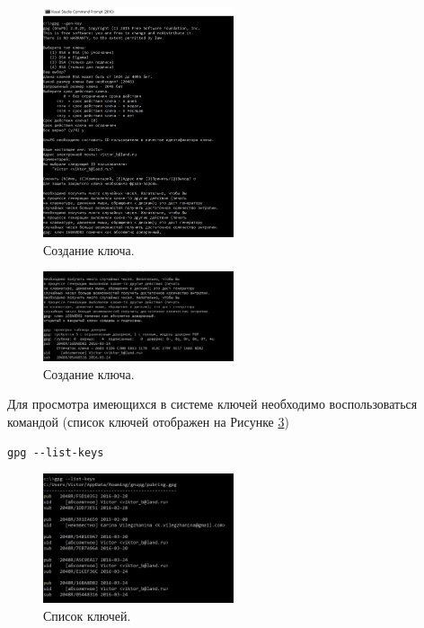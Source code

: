 \documentclass[10pt,a4paper]{article}
\begin{document}
\begin{figure}[h]
\begin{center}
\includegraphics[width=0.5\textwidth]{console_create_1} %
\caption{Создание ключа.}
\label{fig:console_create_1}
\end{center}
\end{figure}

\begin{figure}[h]
\begin{center}
\includegraphics[width=0.5\textwidth]{console_create_2} %
\caption{Создание ключа.}
\label{fig:console_create_2}
\end{center}
\end{figure}

Для просмотра имеющихся в системе ключей необходимо воспользоваться командой (список ключей отображен на Рисунке \ref{fig:console_list})
\begin{verbatim}
gpg --list-keys
\end{verbatim}


\begin{figure}[h]
\begin{center}
\includegraphics[width=0.5\textwidth]{console_list} %
\caption{Список ключей.}
\label{fig:console_list}
\end{center}
\end{figure}
\end{document}
